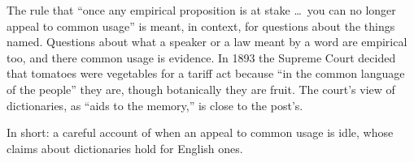 \begin{afterword}
The rule that ``once any empirical proposition is at stake \ldots\ you can no longer appeal to common usage'' is meant, in context, for questions about the things named. Questions about what a speaker or a law meant by a word are empirical too, and there common usage is evidence. In 1893 the Supreme Court decided that tomatoes were vegetables for a tariff act because ``in the common language of the people'' they are, though botanically they are fruit. The court's view of dictionaries, as ``aids to the memory,'' is close to the post's.

In short: a careful account of when an appeal to common usage is idle, whose claims about dictionaries hold for English ones.
\end{afterword}
